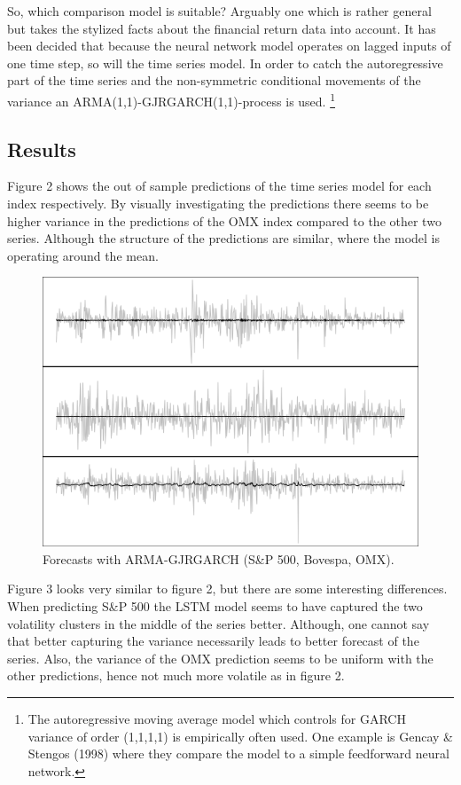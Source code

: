 \documentclass[12pt, letterpaper]{amsart}%
\begin{document}
So, which comparison model is suitable? Arguably one which is rather general but takes the stylized facts about the financial return data into account. It has been decided that because the neural network model operates on lagged inputs of one time step, so will the time series model. In order to catch the autoregressive part of the time series and the non-symmetric conditional movements of the variance an ARMA(1,1)-GJRGARCH(1,1)-process is used. \footnote{The autoregressive moving average model which controls for GARCH variance of order (1,1,1,1) is empirically often used. One example is Gencay \& Stengos (1998) where they compare the model to a simple feedforward neural network.}

\subsection{Results}
Figure 2 shows the out of sample predictions of the time series model for each index respectively. By visually investigating the predictions there seems to be higher variance in the predictions of the OMX index compared to the other two series. Although the structure of the predictions are similar, where the model is operating around the mean.


\begin{figure}[H]
\caption{Forecasts with ARMA-GJRGARCH (S\&P 500, Bovespa, OMX).}
\centering
\includegraphics[scale=0.5]{garch_pred.png}
\end{figure}

Figure 3 looks very similar to figure 2, but there are some interesting differences. When predicting S\&P 500 the LSTM model seems to have captured the two volatility clusters in the middle of the series better. Although, one cannot say that better capturing the variance necessarily leads to better forecast of the series. Also, the variance of the OMX prediction seems to be uniform with the other predictions, hence not much more volatile as in figure 2.
\end{document}
